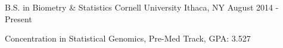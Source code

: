 

\begin{cventries}

  \cventry
    {B.S. in Biometry \& Statistics} %
    {Cornell University} %
    {Ithaca, NY} %
    {August 2014 - Present} %
    {
      \begin{cvitems} %
        \item {Concentration in Statistical Genomics, Pre-Med Track, GPA: 3.527}
      \end{cvitems}
    }
\end{cventries}
